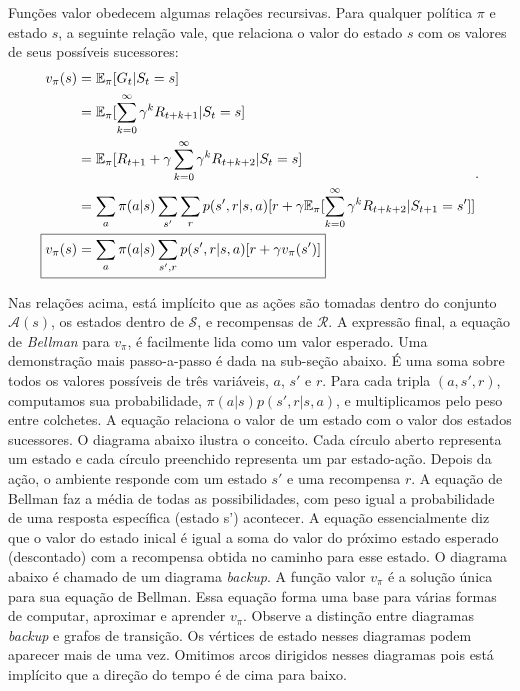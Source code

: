 \documentclass{article}
\begin{document}
Funções valor obedecem algumas relações recursivas. Para qualquer política $\pi$ e estado $s$, a seguinte relação vale, que relaciona o valor do estado $s$ com os valores de seus possíveis sucessores:
\[
\begin{align*}
  v_{\pi}(s)&=\mathbb{E}_{\pi}[G_t|S_t=s]\\
            &=\mathbb{E}_{\pi}[\sum_{k=0}^{\infty} {\gamma}^kR_{t+k+1}|S_t=s]\\
            &=\mathbb{E}_{\pi}[R_{t+1}+\gamma\sum_{k=0}^{\infty} {\gamma}^kR_{t+k+2}|S_t=s]\\
            &=\sum_{a}\pi(a|s) \sum_{s'}\sum_{r}p(s',r|s,a)[r+\gamma \mathbb{E}_{\pi}[\sum_{k=0}^{\infty} {\gamma}^kR_{t+k+2}|S_{t+1}=s']]\\
  \Aboxed{v_{\pi}(s)&=\sum_{a}\pi(a|s) \sum_{s',r}p(s',r|s,a)[r+\gamma v_{\pi}(s')]}
\end{align*}
.\] 

Nas relações acima, está implícito que as ações são tomadas dentro do conjunto $\mathcal{A}(s)$, os estados dentro de $\mathcal{S}$, e recompensas de $\mathcal{R}$. A expressão final, a equação de \textit{Bellman} para $v_{\pi}$, é facilmente lida como um valor esperado. Uma demonstração mais passo-a-passo é dada na sub-seção abaixo. É uma soma sobre todos os valores possíveis de três variáveis, $a$, $s'$ e $r$. Para cada tripla $(a,s',r)$, computamos sua probabilidade, $\pi(a|s)p(s',r|s,a)$, e multiplicamos pelo peso entre colchetes. A equação relaciona o valor de um estado com o valor dos estados sucessores. O diagrama abaixo ilustra o conceito. Cada círculo aberto representa um estado e cada círculo preenchido representa um par estado-ação. Depois da ação, o ambiente responde com um estado $s'$ e uma recompensa $r$. A equação de Bellman faz a média de todas as possibilidades, com peso igual a probabilidade de uma resposta específica (estado s') acontecer. A equação essencialmente diz que o valor do estado inical é igual a soma do valor do próximo estado esperado (descontado) com a recompensa obtida no caminho para esse estado. O diagrama abaixo é chamado de um diagrama \textit{backup}. A função valor $v_{\pi}$ é a solução única para sua equação de Bellman. Essa equação forma uma base para várias formas de computar, aproximar e aprender $v_{\pi}$. Observe a distinção entre diagramas \textit{backup} e grafos de transição. Os vértices de estado nesses diagramas podem aparecer mais de uma vez. Omitimos arcos dirigidos nesses diagramas pois está implícito que a direção do tempo é de cima para baixo.
\end{document}
